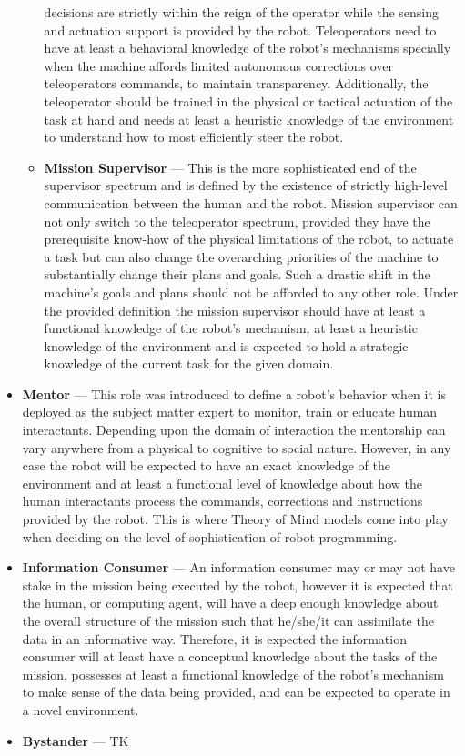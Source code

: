 \documentclass[letterpaper, 10 pt, conference]{ieeeconf} %
\theoremstyle{definition} \newtheorem{definition}{Definition}
\begin{document}
\begin{itemize}{}
\begin{itemize}{}
        decisions are strictly within the reign of the operator while the
        sensing and actuation support is provided by the robot. Teleoperators
        need to have at least a behavioral knowledge of the robot's mechanisms
        specially when the machine affords limited autonomous corrections over
        teleoperators commands, to maintain transparency. Additionally, the
        teleoperator should be trained in the physical or tactical actuation of
        the task at hand and needs at least a heuristic knowledge of the
        environment to understand how to most efficiently steer the robot.
      \item \textbf{Mission Supervisor} --- This is the more sophisticated end
        of the supervisor spectrum and is defined by the existence of strictly
        high-level communication between the human and the robot. Mission
        supervisor can not only switch to the teleoperator spectrum, provided
        they have the prerequisite know-how of the physical limitations of the
        robot, to actuate a task but can also change the overarching priorities
        of the machine to substantially change their plans and goals. Such a
        drastic shift in the machine's goals and plans should not be afforded to
        any other role. Under the provided definition the mission supervisor
        should have at least a functional knowledge of the robot's mechanism, at
        least a heuristic knowledge of the environment and is expected to hold a
        strategic knowledge of the current task for the given domain.
    \end{itemize}
  \item \textbf{Mentor} --- This role was introduced to define a robot's
    behavior when it is deployed as the subject matter expert to monitor, train
    or educate human interactants. Depending upon the domain of interaction the
    mentorship can vary anywhere from a physical to cognitive to social nature.
    However, in any case the robot will be expected to have an exact knowledge
    of the environment and at least a functional level of knowledge about how
    the human interactants process the commands, corrections and instructions
    provided by the robot. This is where Theory of Mind models come into play
    when deciding on the level of sophistication of robot programming.
  \item \textbf{Information Consumer} --- An information consumer may or may not
    have stake in the mission being executed by the robot, however it is
    expected that the human, or computing agent, will have a deep enough
    knowledge about the overall structure of the mission such that he/she/it can
    assimilate the data in an informative way. Therefore, it is expected the
    information consumer will at least have a conceptual knowledge about the
    tasks of the mission, possesses at least a functional knowledge of the
    robot's mechanism to make sense of the data being provided, and can be
    expected to operate in a novel environment.
  \item \textbf{Bystander} --- TK
\end{itemize}
\end{document}
